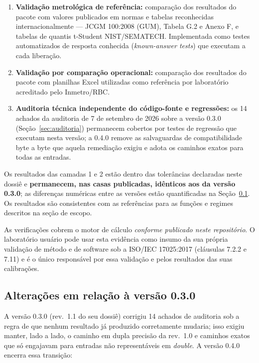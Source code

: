 \documentclass[11pt,a4paper]{article}
\newcommand{\docVersion}{0.4.0}
\newcommand{\auditDate}{7 de setembro de 2026}
\newcommand{\previousVersion}{0.3.0}
\begin{document}
\begin{enumerate}
  \item \textbf{Validação metrológica de referência:} comparação dos resultados do pacote com valores publicados em normas e tabelas reconhecidas internacionalmente --- JCGM 100:2008 (GUM), Tabela G.2 e Anexo F, e tabelas de quantis t-Student NIST/SEMATECH. Implementada como testes automatizados de resposta conhecida (\emph{known-answer tests}) que executam a cada liberação.
  \item \textbf{Validação por comparação operacional:} comparação dos resultados do pacote com planilhas Excel utilizadas como referência por laboratório acreditado pelo Inmetro/RBC.
  \item \textbf{Auditoria técnica independente do código-fonte e regressões:} os 14 achados da auditoria de \auditDate{} sobre a versão \previousVersion{} (Seção~\ref{sec:auditoria}) permanecem cobertos por testes de regressão que executam nesta versão; a \docVersion{} remove as salvaguardas de compatibilidade byte a byte que aquela remediação exigiu e adota os caminhos exatos para todas as entradas.
\end{enumerate}

Os resultados das camadas 1 e 2 estão dentro das tolerâncias declaradas neste dossiê e \textbf{permanecem, nas casas publicadas, idênticos aos da versão \previousVersion{}}; as diferenças numéricas entre as versões estão quantificadas na Seção~\ref{sec:delta}. Os resultados são consistentes com as referências para as funções e regimes descritos na seção de escopo.

As verificações cobrem o motor de cálculo \emph{conforme publicado neste repositório}. O laboratório usuário pode usar esta evidência como insumo da sua própria validação de método e de software sob a ISO/IEC 17025:2017 (cláusulas 7.2.2 e 7.11) e é o único responsável por essa validação e pelos resultados das suas calibrações.

\subsection{Alterações em relação à versão \previousVersion}
\label{sec:delta}

A versão \previousVersion{} (rev.\ 1.1 do seu dossiê) corrigiu 14 achados de auditoria sob a regra de que nenhum resultado já produzido corretamente mudaria; isso exigiu manter, lado a lado, o caminho em dupla precisão da rev.\ 1.0 e caminhos exatos que só engajavam para entradas não representáveis em \emph{double}. A versão \docVersion{} encerra essa transição:
\end{document}
